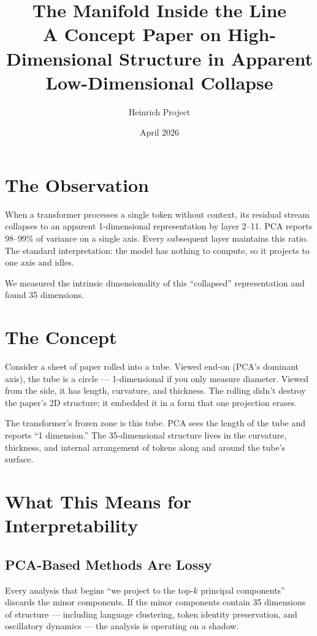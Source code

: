 \documentclass[11pt]{article}
\title{The Manifold Inside the Line\\
\large{A Concept Paper on High-Dimensional Structure in Apparent Low-Dimensional Collapse}}
\author{Heinrich Project}
\date{April 2026}
\begin{document}
\maketitle

\section{The Observation}

When a transformer processes a single token without context, its residual stream collapses to an apparent 1-dimensional representation by layer 2--11. PCA reports 98--99\% of variance on a single axis. Every subsequent layer maintains this ratio. The standard interpretation: the model has nothing to compute, so it projects to one axis and idles.

We measured the intrinsic dimensionality of this ``collapsed'' representation and found 35 dimensions.

\section{The Concept}

Consider a sheet of paper rolled into a tube. Viewed end-on (PCA's dominant axis), the tube is a circle --- 1-dimensional if you only measure diameter. Viewed from the side, it has length, curvature, and thickness. The rolling didn't destroy the paper's 2D structure; it embedded it in a form that one projection erases.

The transformer's frozen zone is this tube. PCA sees the length of the tube and reports ``1 dimension.'' The 35-dimensional structure lives in the curvature, thickness, and internal arrangement of tokens along and around the tube's surface.

\section{What This Means for Interpretability}

\subsection{PCA-Based Methods Are Lossy}

Every analysis that begins ``we project to the top-$k$ principal components'' discards the minor components. If the minor components contain 35 dimensions of structure --- including language clustering, token identity preservation, and oscillatory dynamics --- the analysis is operating on a shadow.
\end{document}
